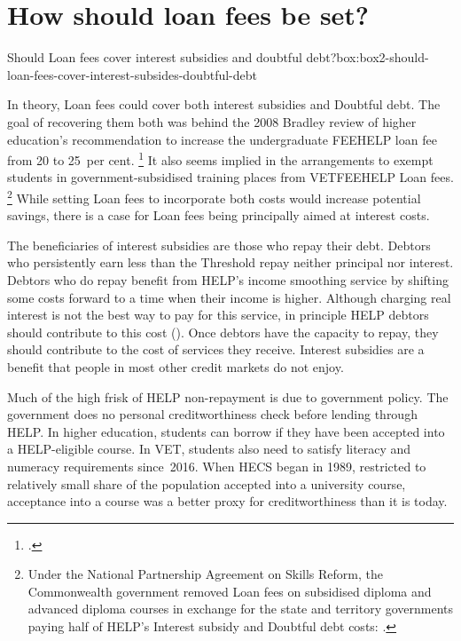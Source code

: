 \documentclass[embargoed]{grattan}
\begin{document}
\section{How should loan fees be set?}\label{how-should-loan-fees-be-set}


\begin{bigbox*}{Should \gls{Loan fees} cover interest subsidies and doubtful debt?}{box:box2-should-loan-fees-cover-interest-subsides-doubtful-debt}

In theory, \gls{Loan fees} could cover both interest subsidies and \gls{Doubtful debt}.
The goal of recovering them both was behind the 2008 Bradley review of higher education's recommendation to increase the undergraduate \gls{FEEHELP} loan fee from 20 to 25~per cent.%
\footcite[][167--168]{Bradley2008ReviewAustralianhigher}
It also seems implied in the arrangements to exempt students in government-subsidised training places from \gls{VETFEEHELP} \gls{Loan fees}.%
\footnote{Under the National Partnership Agreement on Skills Reform, the Commonwealth government removed \gls{Loan fees} on subsidised diploma and advanced diploma courses in exchange for the state and territory governments paying half of \gls{HELP}'s \gls{Interest subsidy} and \gls{Doubtful debt} costs: \textcite[][25]{AustralianGovernments2012NationalPartnershipAgreement}.} While setting \gls{Loan fees} to incorporate both costs would increase potential savings, there is a case for \gls{Loan fees} being principally aimed at interest costs.

The beneficiaries of interest subsidies are those who repay their debt.
Debtors who persistently earn less than the \gls{Threshold} repay neither principal nor interest.
Debtors who do repay benefit from \gls{HELP}'s income smoothing service by shifting some costs forward to a time when their income is higher.
Although charging real interest is not the best way to pay for this service, in principle \gls{HELP} debtors should contribute to this cost ().
Once debtors have the capacity to repay, they should contribute to the cost of services they receive.
Interest subsidies are a benefit that people in most other credit markets do not enjoy.

Much of the high frisk of \gls{HELP} non-repayment is due to government policy.
The government does no personal creditworthiness check before lending through \gls{HELP}\@.
In higher education, students can borrow if they have been accepted into a \gls{HELP}-eligible course.
In VET, students also need to satisfy literacy and numeracy requirements since~2016.
When \gls{HECS} began in 1989, restricted to relatively small share of the population accepted into a university course, acceptance into a course was a better proxy for creditworthiness than it is today.


\end{bigbox*}
\end{document}
